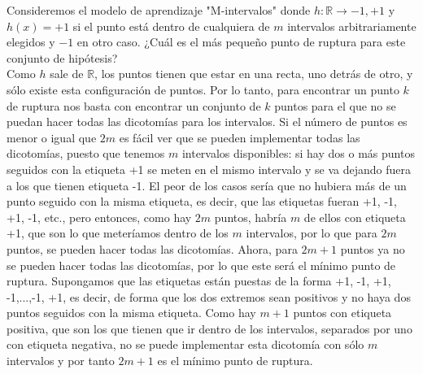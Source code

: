 \documentclass[12pt]{article}
\theoremstyle{definition}
\begin{document}
\begin{pregunta}
Consideremos el modelo de aprendizaje "M-intervalos" \textit{ }donde $h: \mathbb{R} \rightarrow {-1, +1}$ y $h(x)=+1$ si el punto está dentro de cualquiera de $m$ intervalos arbitrariamente elegidos y $-1$ en otro caso. ¿Cuál es el más pequeño punto de ruptura para este conjunto de hipótesis?\\

Como $h$ sale de $\mathbb{R}$, los puntos tienen que estar en una recta, uno detrás de otro, y sólo existe esta configuración de puntos. Por lo tanto, para encontrar un punto $k$ de ruptura nos basta con encontrar un conjunto de $k$ puntos para el que no se puedan hacer todas las dicotomías para los intervalos. Si el número de puntos es menor o igual que $2m$ es fácil ver que se pueden implementar todas las dicotomías, puesto que tenemos $m$ intervalos disponibles: si hay dos o más puntos seguidos con la etiqueta +1 se meten en el mismo intervalo y se va dejando fuera a los que tienen etiqueta -1. El peor de los casos sería que no hubiera más de un punto seguido con la misma etiqueta, es decir, que las etiquetas fueran +1, -1, +1, -1, etc., pero entonces, como hay $2m$ puntos, habría $m$ de ellos con etiqueta +1, que son lo que meteríamos dentro de los $m$ intervalos, por lo que para $2m$ puntos, se pueden hacer todas las dicotomías. Ahora, para $2m+1$ puntos ya no se pueden hacer todas las dicotomías, por lo que este será el mínimo punto de ruptura. Supongamos que las etiquetas están puestas de la forma +1, -1, +1, -1,...,-1, +1, es decir, de forma que los dos extremos sean positivos y no haya dos puntos seguidos con la misma etiqueta. Como hay $m+1$ puntos con etiqueta positiva, que son los que tienen que ir dentro de los intervalos, separados por uno con etiqueta negativa, no se puede implementar esta dicotomía con sólo $m$ intervalos y por tanto $2m+1$ es el mínimo punto de ruptura.
\end{pregunta}
\end{document}
